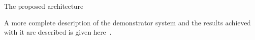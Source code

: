 The proposed architecture

A more complete description of the demonstrator system and the results achieved with it are described is given here~\cite{TMTT_JINST}.




%
%

